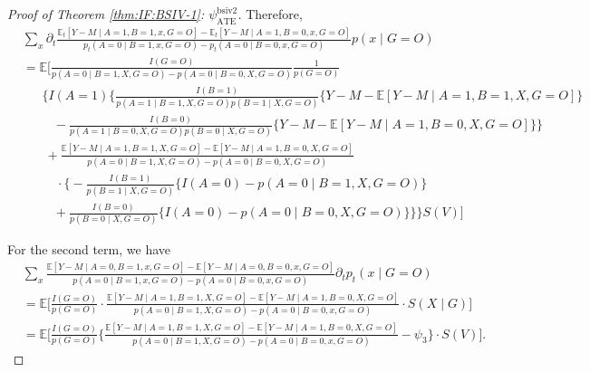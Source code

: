 \documentclass[10pt]{article}
\begin{document}
\begin{proof}[Proof of Theorem \ref{thm:IF:BSIV-1}: $\psi_{\text{ATE}}^{\text{bsiv2}}$]
Therefore,
{\footnotesize \begin{align*}
    &\sum_{x}\partial_t\frac{\mathbb{E}_t[Y-M\mid A=1,B=1,x,G=O]-\mathbb{E}_t[Y-M\mid A=1,B=0,x,G=O]}{p_t(A=0\mid B=1,x,G=O)-p_t(A=0\mid B=0,x,G=O)}p(x\mid G=O)\\
    &=\mathbb{E}\bigg[\frac{I(G=O)}{p(A=0\mid B=1,X,G=O)-p(A=0\mid B=0,X,G=O)}\frac{1}{p(G=O)}\\
    &\ \ \ \ \ \ \ \bigg\{I(A=1)\big\{\frac{I(B=1)}{p(A=1\mid B=1,X,G=O)p(B=1\mid X,G=O)}\{Y-M-\mathbb{E}[Y-M\mid A=1,B=1,X,G=O]\}\\
    &\ \ \ \ \ \ \ \ \ \ \ -\frac{I(B=0)}{p(A=1\mid B=0,X,G=O)p(B=0\mid X,G=O)}\{Y-M-\mathbb{E}[Y-M\mid A=1,B=0,X,G=O]\}\big\}\\
    &\ \ \ \ \ \ \ \ +\frac{\mathbb{E}[Y-M\mid A=1,B=1,X,G=O]-\mathbb{E}[Y-M\mid A=1,B=0,X,G=O]}{p(A=0\mid B=1,X,G=O)-p(A=0\mid B=0,X,G=O)}\\
    &\ \ \ \ \ \ \ \ \ \ \ \ \cdot\big\{-\frac{I(B=1)}{p(B=1\mid X, G=O)}\{I(A=0)-p(A=0\mid B=1,X,G=O)\}\\
    &\ \ \ \ \ \ \ \ \ \ \ +\frac{I(B=0)}{p(B=0\mid X, G=O)}\{I(A=0)-p(A=0\mid B=0,X,G=O)\}\big\}\bigg\}S(V)\bigg]
\end{align*}}

For the second term, we have
{\footnotesize \begin{align*}
    &\sum_{x}\frac{\mathbb{E}[Y-M\mid A=0,B=1,x,G=O]-\mathbb{E}[Y-M\mid A=0,B=0,x,G=O]}{p(A=0\mid B=1,x,G=O)-p(A=0\mid B=0,x,G=O)}\partial_tp_t(x\mid G=O)\\
    &=\mathbb{E}\bigg[\frac{I(G=O)}{p(G=O)}\cdot\frac{\mathbb{E}[Y-M\mid A=1,B=1,X,G=O]-\mathbb{E}[Y-M\mid A=1,B=0,X,G=O]}{p(A=0\mid B=1,X,G=O)-p(A=0\mid B=0,x,G=O)}\cdot S(X\mid G)\bigg]\\
    &=\mathbb{E}\bigg[\frac{I(G=O)}{p(G=O)}\bigg\{\frac{\mathbb{E}[Y-M\mid A=1,B=1,X,G=O]-\mathbb{E}[Y-M\mid A=1,B=0,X,G=O]}{p(A=0\mid B=1,X,G=O)-p(A=0\mid B=0,x,G=O)}-\psi_3\bigg\}\cdot S(V)\bigg].
\end{align*}}


\end{proof}
\end{document}
